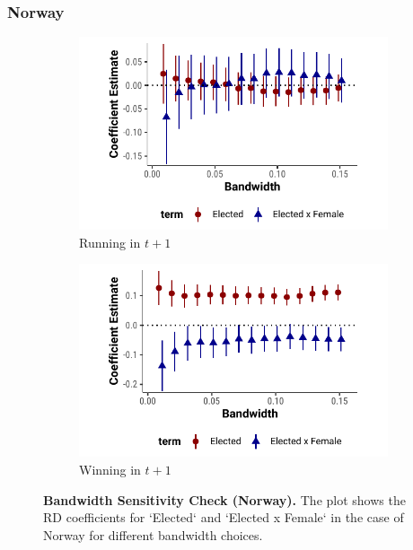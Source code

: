 \documentclass[12pt]{article}
\begin{document}
\subsubsection{Norway}
\begin{figure}[!htb]
    \centering
    \begin{subfigure}[t]{0.48\textwidth}
    \includegraphics[width = 1 \textwidth]{../output/figures/norway_run_again_bw.pdf}
    \caption{Running in $t+1$}
    \end{subfigure}%
    \begin{subfigure}[t]{0.48\textwidth}
    \includegraphics[width = 1 \textwidth]{../output/figures/norway_win_again_bw.pdf}
    \caption{Winning in $t+1$}
    \end{subfigure}
    \caption{\textbf{Bandwidth Sensitivity Check (Norway).} The plot shows the RD coefficients for `Elected` and `Elected x Female` in the case of Norway for different bandwidth choices.}
    \label{fig:norway_bw_sens}
\end{figure}
\end{document}
